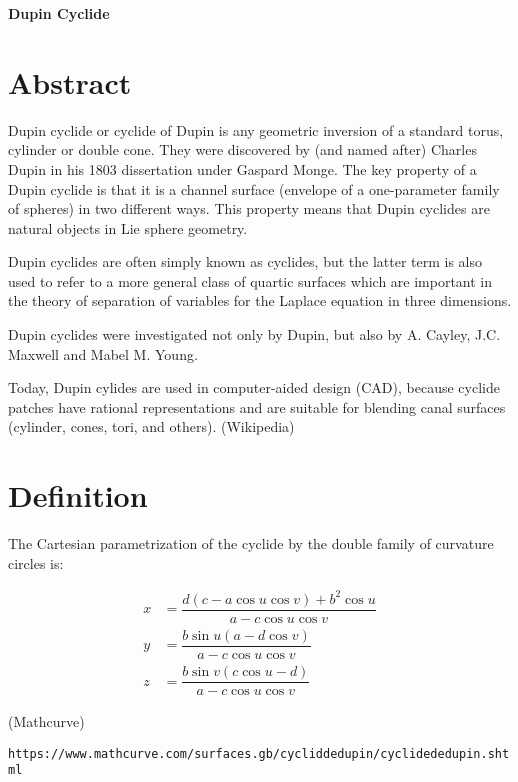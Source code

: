 \documentclass[12pt,dvipdfmx]{article}
\begin{document}
\begin{center}

{\bf \Large Dupin Cyclide}

\end{center}


\section{Abstract}
Dupin cyclide or cyclide of Dupin is any geometric inversion of a standard torus, cylinder or double cone.  They were discovered by (and named after) Charles Dupin in his 1803 dissertation under Gaspard Monge. The key property of a Dupin cyclide is that it is a channel surface (envelope of a one-parameter family of spheres) in two different ways. This property means that Dupin cyclides are natural objects in Lie sphere geometry.

Dupin cyclides are often simply known as cyclides, but the latter term is also used to refer to a more general class of quartic surfaces which are important in the theory of separation of variables for the Laplace equation in three dimensions.

Dupin cyclides were investigated not only by Dupin, but also by A. Cayley, J.C. Maxwell and Mabel M. Young.

Today, Dupin cylides are used in computer-aided design (CAD), because cyclide patches have rational representations and are suitable for blending canal surfaces (cylinder, cones, tori, and others).  (Wikipedia)

\section{Definition}

The Cartesian parametrization of the cyclide by the double family of curvature circles is:

\[
\begin{aligned}
x &= \dfrac{d(c - a \cos u \cos v) + b^2 \cos u}{a - c \cos u \cos v} \\
y &= \dfrac{b\sin u (a - d \cos v)}{a - c \cos u \cos v} \\
z &= \dfrac{b \sin v ( c \cos u - d )}{a - c \cos u \cos v}
\end{aligned}
\]

(Mathcurve)



\begin{thebibliography}{9}

\verb|https://www.mathcurve.com/surfaces.gb/cycliddedupin/cyclidededupin.shtml|


\end{thebibliography}
\end{document}
